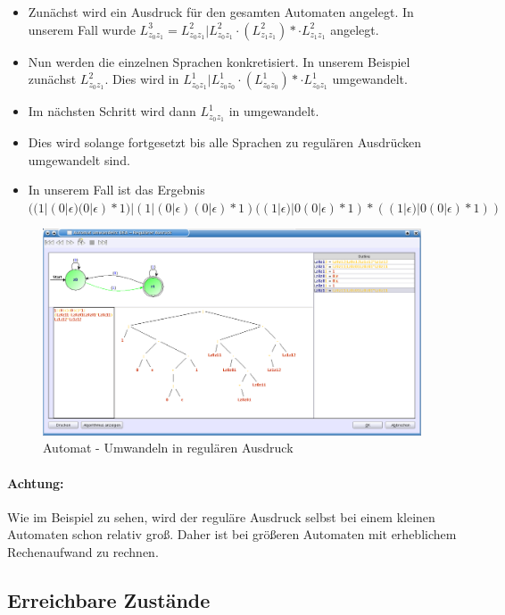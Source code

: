 \begin{itemize}

   \item Zunächst wird ein Ausdruck für den gesamten Automaten angelegt. In unserem Fall wurde $L_{z_0 z_1}^3 = L_{z_0 z_1}^2 | L_{z_0 z_1}^2 · (L_{z_1 z_1}^2)* · L_{z_1 z_1}^2$ angelegt.
   \item Nun werden die einzelnen Sprachen konkretisiert. In unserem Beispiel zunächst $L_{z_0 z_1}^2$. Dies wird in $L_{z_0 z_1}^1 | L_{z_0 z_0}^1 · (L_{z_0 z_0}^1)* · L_{z_0 z_1}^1$ umgewandelt.
   \item Im nächsten Schritt wird dann $L_{z_0 z_1}^1$ in  umgewandelt.
   \item Dies wird solange fortgesetzt bis alle Sprachen zu regulären Ausdrücken umgewandelt sind.
   \item In unserem Fall ist das Ergebnis $((1|(0|\epsilon)(0|\epsilon)*1)|(1|(0|\epsilon)(0|\epsilon)*1)((1|\epsilon)|0(0|\epsilon)*1)*((1|\epsilon)|0(0|\epsilon)*1))$

\end{itemize}

\begin{figure}[h!]
\begin{center}
\includegraphics[width=12cm]{../images/dfa_to_regex.png}
\caption{Automat - Umwandeln in regulären Ausdruck}
\end{center}
\end{figure}

\paragraph{Achtung:} Wie im Beispiel zu sehen, wird der reguläre Ausdruck selbst bei einem kleinen Automaten schon relativ groß. Daher ist bei größeren Automaten mit erheblichem Rechenaufwand zu rechnen.

\subsection{Erreichbare Zustände}\label{ReachableStates}

